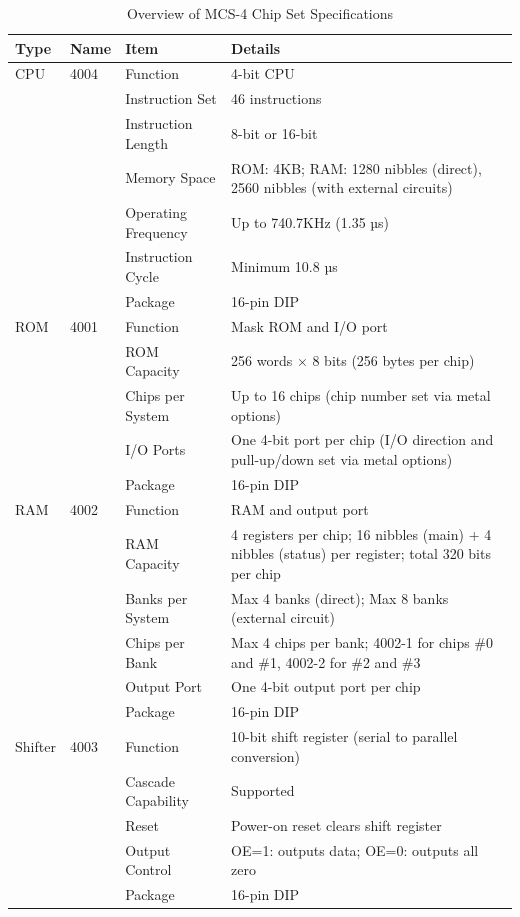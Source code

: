 \begin{table}[htbp]
\centering
\begin{tabular}{|l|l|l|p{8cm}|}
\hline
\rowcolor{LightPurple}
\textbf{Type} & \textbf{Name} & \textbf{Item} & \textbf{Details} \\
\hline
CPU & 4004 & Function & 4-bit CPU \\
\cline{3-4}
     &      & Instruction Set & 46 instructions \\
\cline{3-4}
     &      & Instruction Length & 8-bit or 16-bit \\
\cline{3-4}
     &      & Memory Space & ROM: 4KB; RAM: 1280 nibbles (direct), 2560 nibbles (with external circuits) \\
\cline{3-4}
     &      & Operating Frequency & Up to 740.7KHz (1.35 µs) \\
\cline{3-4}
     &      & Instruction Cycle & Minimum 10.8 µs \\
\cline{3-4}
     &      & Package & 16-pin DIP \\
\hline
ROM & 4001 & Function & Mask ROM and I/O port \\
\cline{3-4}
     &      & ROM Capacity & 256 words × 8 bits (256 bytes per chip) \\
\cline{3-4}
     &      & Chips per System & Up to 16 chips (chip number set via metal options) \\
\cline{3-4}
     &      & I/O Ports & One 4-bit port per chip (I/O direction and pull-up/down set via metal options) \\
\cline{3-4}
     &      & Package & 16-pin DIP \\
\hline
RAM & 4002 & Function & RAM and output port \\
\cline{3-4}
     &      & RAM Capacity & 4 registers per chip; 16 nibbles (main) + 4 nibbles (status) per register; total 320 bits per chip \\
\cline{3-4}
     &      & Banks per System & Max 4 banks (direct); Max 8 banks (external circuit) \\
\cline{3-4}
     &      & Chips per Bank & Max 4 chips per bank; 4002-1 for chips \#0 and \#1, 4002-2 for \#2 and \#3 \\
\cline{3-4}
     &      & Output Port & One 4-bit output port per chip \\
\cline{3-4}
     &      & Package & 16-pin DIP \\
\hline
Shifter & 4003 & Function & 10-bit shift register (serial to parallel conversion) \\
\cline{3-4}
     &       & Cascade Capability & Supported \\
\cline{3-4}
     &       & Reset & Power-on reset clears shift register \\
\cline{3-4}
     &       & Output Control & OE=1: outputs data; OE=0: outputs all zero \\
\cline{3-4}
     &       & Package & 16-pin DIP \\
\hline
\end{tabular}
\caption{Overview of MCS-4 Chip Set Specifications}
\label{tb:MCS4CHIPSETOVERVIEW}
\end{table}

